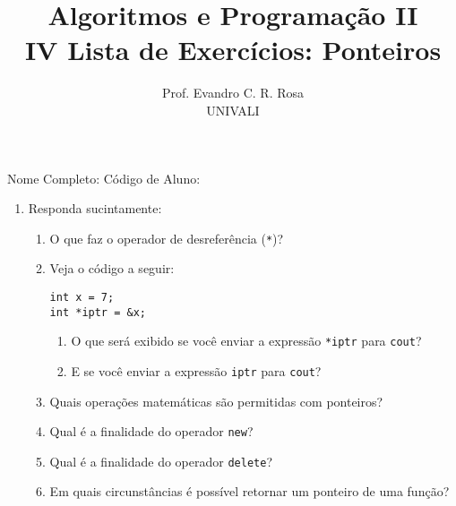 \documentclass[12pt]{article}
\title{Algoritmos e Programação II\\
\large IV Lista de Exercícios: Ponteiros}
\author{Prof. Evandro C. R. Rosa\\UNIVALI}
\date{}
\begin{document}
\maketitle

\noindent Nome Completo: \underline{\hspace{8cm}} Código de Aluno: \underline{\hspace{2.4cm}}

\begin{enumerate}
    \item Responda sucintamente:
        \begin{enumerate}
            \item O que faz o operador de desreferência (\texttt{*})?
            \item Veja o código a seguir:
                \begin{verbatim}
int x = 7;
int *iptr = &x; 
                \end{verbatim}
                \begin{enumerate}
                  \item O que será exibido se você enviar a expressão \texttt{*iptr} para \texttt{cout}?
                  \item E se você enviar a expressão \texttt{iptr} para \texttt{cout}?
                \end{enumerate}
            \item Quais operações matemáticas são permitidas com ponteiros?
            \item Qual é a finalidade do operador \texttt{new}?
            \item Qual é a finalidade do operador \texttt{delete}?
            \item Em quais circunstâncias é possível retornar um ponteiro de uma função?
        \end{enumerate}


\end{enumerate}
\end{document}
